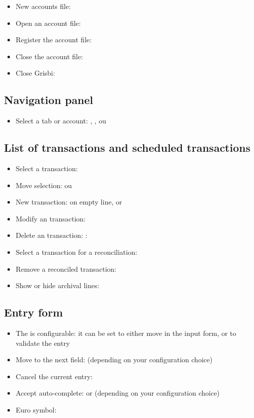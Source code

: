 \begin{itemize}
	\item New accounts file: 
	\item Open an account file: 
	\item Register the account file: 
	\item Close the account file: 
	\item Close Grisbi: 
\end{itemize}


\subsection{Navigation panel}

\begin{itemize}
	\item Select a tab or account: , ,  ou 
\end{itemize}

\subsection{List of transactions and scheduled transactions}

\begin{itemize}
	\item Select a transaction: 
	\item Move selection: ou 
	\item New transaction:   on empty line, or 
	\item Modify an transaction: 
	\item Delete an transaction: :
	\item Select a transaction for a reconciliation:
	\item Remove a reconciled transaction: 
	\item Show or hide archival lines: 
\end{itemize}


\subsection{Entry form}

\begin{itemize}
	\item The  is configurable: it can be set to either move in the input form, or to validate the entry
	\item Move to the next field:  (depending on your configuration choice)
	\item Cancel the current entry: 
	\item Accept auto-complete:  or  (depending on your configuration choice)
	\item  Euro symbol: 
\end{itemize}

